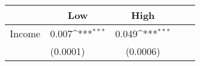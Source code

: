 {
\def\sym#1{\ifmmode^{#1}\else\(^{#1}\)\fi}
\begin{tabular*}{.6\hsize}{@{\hskip\tabcolsep\extracolsep\fill}l*{2}{lc}}
\toprule
                &\multicolumn{1}{c}{Low}&\multicolumn{1}{c}{High}\\
\midrule
Income          &    0.007\sym{***}&    0.049\sym{***}\\
                & (0.0001)         & (0.0006)         \\
\bottomrule
\end{tabular*}
}
